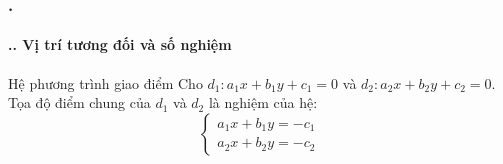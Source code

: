 \documentclass[11pt, aspectratio=169]{beamer}
\begin{document}
\begin{frame}[fragile]
    \frametitle{\thesection. \insertsection}
    \framesubtitle{\thesection.\thesubsection. Vị trí tương đối và số nghiệm}

    \begin{block}{Hệ phương trình giao điểm}
        \footnotesize
        Cho $d_1: a_1x + b_1y + c_1 = 0$ và $d_2: a_2x + b_2y + c_2 = 0$. 
        Tọa độ điểm chung của $d_1$ và $d_2$ là nghiệm của hệ:
        \[\begin{cases} a_1x + b_1y = -c_1 \\ a_2x + b_2y = -c_2 \end{cases}\]
    \end{block}
    
    \vspace{0.2cm}
    

\end{frame}
\end{document}
